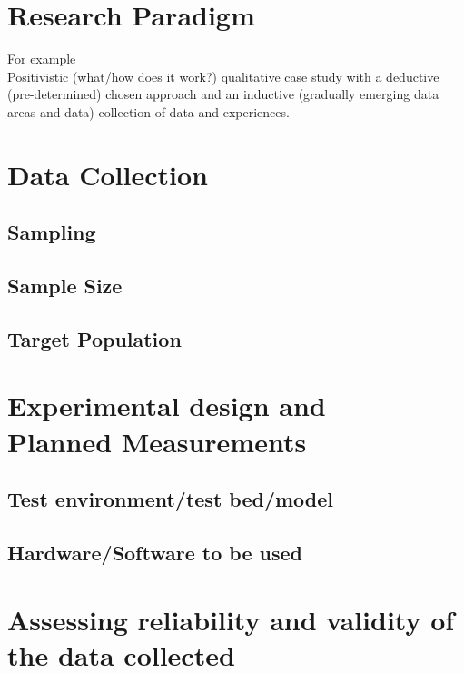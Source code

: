 \section{Research Paradigm}
\label{sec:researchParadigm}
For example\\
Positivistic (what/how does it work?) qualitative case study with a deductive (pre-determined) chosen approach and an inductive (gradually emerging data areas and data) collection of data and experiences.


\section{Data Collection}
\label{sec:dataCollection}



\subsection{Sampling}

\subsection{Sample Size}

\subsection{Target Population}
\section[Experimental design/Planned Measurements]{Experimental design and\\Planned Measurements}
\label{sec:experimentalDesign}

\subsection{Test environment/test bed/model}

\subsection{Hardware/Software to be used}


\section{Assessing reliability and validity of the data collected}
\label{sec:assessingReliability}


